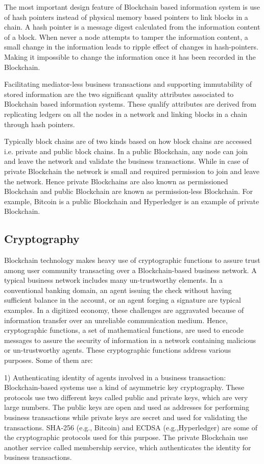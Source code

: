 \documentclass[10pt]{IETBook}
\begin{document}
The most important design feature of Blockchain based information system is use of hash pointers instead of physical memory based pointers to link blocks in a chain. A hash pointer is a message digest calculated from the information content of a block. When never a node attempts to tamper the information content, a small change in the information leads to ripple effect of changes in hash-pointers. Making it impossible to change the information once it has been recorded in the Blockchain. 

Facilitating mediator-less business transactions and supporting immutability of stored information are the two significant quality attributes associated to Blockchain based information systems. These qualify attributes are derived from replicating ledgers on all the nodes in a network and linking blocks in a chain through hash pointers.

Typically block chains are of two kinds based on how block chains are accessed i.e. private and public block chains. In a public Blockchain, any node can join and leave the network and validate the business transactions. While in case of private Blockchain the network is small and required permission to join and leave the network. Hence private Blockchains are also known as permissioned Blockchain and public Blockchain are known as permission-less Blockchain. For example, Bitcoin is a public Blockchain and Hyperledger is an example of private Blockchain.

 
\subsection{Cryptography}
Blockchain technology makes heavy use of cryptographic functions to assure trust among user community transacting over a Blockchain-based business network. A typical business network includes many un-trustworthy elements. In a conventional banking domain, an agent issuing the check without having sufficient balance in the account, or an agent forging a signature are typical examples. In a digitized economy, these challenges are aggravated because of information transfer over an unreliable communication medium. Hence, cryptographic functions, a set of mathematical functions, are used to encode messages to assure the security of information in a network containing malicious or un-trustworthy agents. These cryptographic functions address various purposes. Some of them are:

1) Authenticating identity of agents involved in a business transaction: Blockchain-based systems use a kind of asymmetric key cryptography. These protocols use two different keys called public and private keys, which are very large numbers. The public keys are open and used as addresses for performing business transactions while private keys are secret and used for validating the transactions. SHA-256 (e.g., Bitcoin) and ECDSA (e.g.,Hyperledger) are some of the cryptographic protocols used for this purpose. The private Blockchain use another service called membership service, which authenticates the identity for business transactions.
\end{document}
